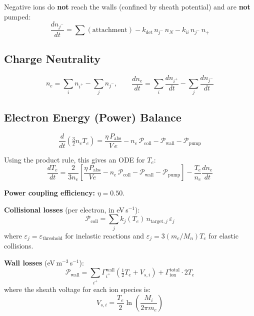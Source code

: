 \documentclass[11pt,a4paper]{article}
\begin{document}
Negative ions do \textbf{not} reach the walls (confined by sheath potential) and are \textbf{not} pumped:
\begin{equation}
  \frac{dn_{j^-}}{dt} = \sum(\text{attachment}) - k_\text{det}\,n_{j^-}\,n_N - k_{ii}\,n_{j^-}\,n_+
\end{equation}

\subsection{Charge Neutrality}

\begin{equation}
  \boxed{n_e = \sum_i n_{i^+} - \sum_j n_{j^-}}, \qquad \frac{dn_e}{dt} = \sum_i \frac{dn_{i^+}}{dt} - \sum_j \frac{dn_{j^-}}{dt}
\end{equation}

\subsection{Electron Energy (Power) Balance}

\begin{equation}\label{eq:power}
  \boxed{\frac{d}{dt}\!\left(\tfrac{3}{2}n_e T_e\right) = \frac{\eta\,P_\text{abs}}{V\,e} - n_e\,\mathcal{P}_\text{coll} - \mathcal{P}_\text{wall} - \mathcal{P}_\text{pump}}
\end{equation}

Using the product rule, this gives an ODE for $T_e$:
\begin{equation}
  \frac{dT_e}{dt} = \frac{2}{3n_e}\left[\frac{\eta\,P_\text{abs}}{Ve} - n_e\,\mathcal{P}_\text{coll} - \mathcal{P}_\text{wall} - \mathcal{P}_\text{pump}\right] - \frac{T_e}{n_e}\frac{dn_e}{dt}
\end{equation}

\textbf{Power coupling efficiency:} $\eta = 0.50$.

\textbf{Collisional losses} (per electron, in eV\,s$^{-1}$):
\begin{equation}
  \mathcal{P}_\text{coll} = \sum_j k_j(T_e)\,n_{\text{target},j}\,\varepsilon_j
\end{equation}
where $\varepsilon_j = \varepsilon_\text{threshold}$ for inelastic reactions and $\varepsilon_j = 3(m_e/M_n)T_e$ for elastic collisions.

\textbf{Wall losses} (eV\,m$^{-3}$\,s$^{-1}$):
\begin{equation}
  \mathcal{P}_\text{wall} = \sum_{i^+} \Gamma_{i^+}^\text{wall}\left(\tfrac{1}{2}T_e + V_{s,i}\right) + \Gamma_\text{ion}^\text{total}\cdot 2T_e
\end{equation}
where the sheath voltage for each ion species is:
\begin{equation}
  V_{s,i} = \frac{T_e}{2}\ln\!\left(\frac{M_i}{2\pi m_e}\right)
\end{equation}
\end{document}
